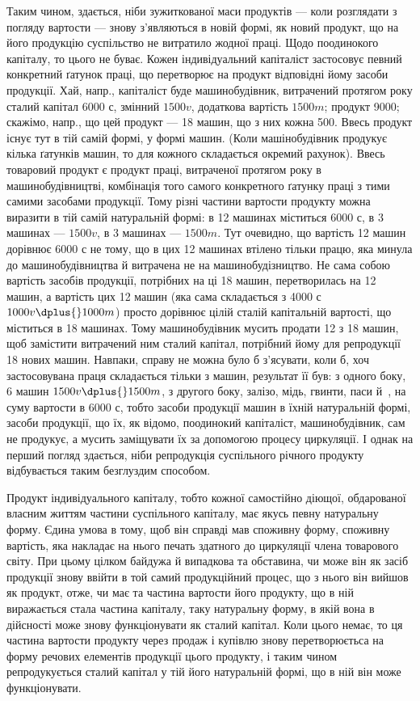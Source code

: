\parcont{}  %
Таким чином, здається, ніби  зужиткованої маси продуктів — коли
розглядати з погляду вартости — знову з’являються в новій формі, як
новий продукт, що на його продукцію суспільство не витратило
жодної праці. Щодо поодинокого капіталу, то цього не буває. Кожен індивідуальний
капіталіст застосовує певний конкретний ґатунок праці, що перетворює
на продукт відповідні йому засоби продукції. Хай, напр., капіталіст
буде машинобудівник, витрачений протягом року сталий капітал \deq{} 6000 с,
змінний \deq{} $1500 v$, додаткова вартість \deq{} $1500 m$; продукт \deq{} 9000; скажімо,
напр., що цей продукт — 18 машин, що з них кожна \deq{} 500. Ввесь продукт
існує тут в тій самій формі, у формі машин. (Коли машінобудівник продукує
кілька ґатунків машин, то для кожного складається окремий рахунок).
Ввесь товаровий продукт є продукт праці, витраченої протягом
року в машинобудівництві, комбінація того самого конкретного ґатунку
праці з тими самими засобами продукції. Тому різні частини вартости
продукту можна виразити в тій самій натуральній формі: в 12 машинах
міститься 6000 с, в 3 машинах — $1500 v$, в 3 машинах — $1500 m$. Тут
очевидно, що вартість 12 машин дорівнює 6000 с не тому, що в цих
12 машинах втілено тільки працю, яка минула до машинобудівництва й
витрачена не на машинобудізництво. Не сама собою вартість засобів
продукції, потрібних на ці 18 машин, перетворилась на 12 машин, а вартість
цих 12 машин (яка сама складається з 4000 с \dplus{} $1000 v \dplus{} 1000 m$)
просто дорівнює цілій сталій капітальній вартості, що міститься в 18 машинах.
Тому машинобудівник мусить продати 12 з 18 машин, щоб замістити
витрачений ним сталий капітал, потрібний йому для репродукції 18
нових машин. Навпаки, справу не можна було б з’ясувати, коли б, хоч
застосовувана праця складається тільки з машин, результат її був: з
одного боку, 6 машин \deq{} $1500 v \dplus{} 1500 m$, з другого боку, залізо,
мідь, гвинти, паси й~, на суму вартости в 6000 с, тобто засоби продукції
машин в їхній натуральній формі, засоби продукції, що їх, як відомо,
поодинокий капіталіст, машинобудівник, сам не продукує, а мусить
заміщувати їх за допомогою процесу циркуляції. І однак на перший погляд
здається, ніби репродукція суспільного річного продукту відбувається
таким безглуздим способом.

Продукт індивідуального капіталу, тобто кожної самостійно діющої,
обдарованої власним життям частини суспільного капіталу, має якусь певну
натуральну форму. Єдина умова в тому, щоб він справді мав споживну
форму, споживну вартість, яка накладає на нього печать здатного до
циркуляції члена товарового світу. При цьому цілком байдужа й випадкова
та обставина, чи може він як засіб продукції знову ввійти в той
самий продукційний процес, що з нього він вийшов як продукт, отже, чи
має та частина вартости його продукту, що в ній виражається стала частина
капіталу, таку натуральну форму, в якій вона в дійсності може знову
функціонувати як сталий капітал. Коли цього немає, то ця частина вартости
продукту через продаж і купівлю знову перетворюєтьса на форму речових
елементів продукції цього продукту, і таким чином репродукується сталий
капітал у тій його натуральній формі, що в ній він може функціонувати.
